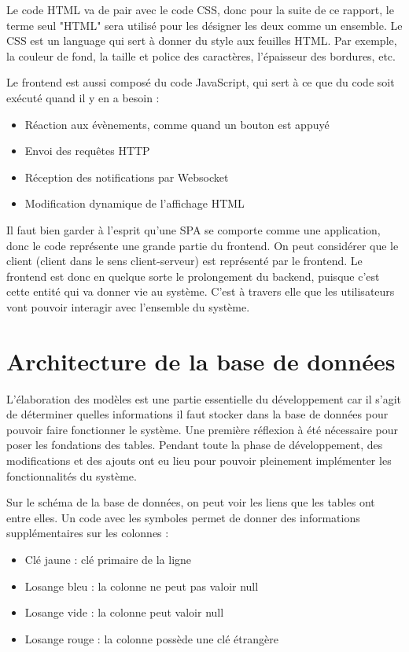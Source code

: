 \documentclass[
    iai, %
    eai, %
]{heig-tb}
\begin{document}
Le code HTML va de pair avec le code CSS, donc pour la suite de ce rapport, le terme seul "HTML" sera utilisé pour les désigner les deux comme un ensemble.
Le CSS est un language qui sert à donner du style aux feuilles HTML. Par exemple, la couleur de fond, la taille et police des caractères, l'épaisseur des bordures, etc.

Le frontend est aussi composé du code JavaScript, qui sert à ce que du code soit exécuté quand il y en a besoin :
\begin{itemize}
  \item Réaction aux évènements, comme quand un bouton est appuyé
  \item Envoi des requêtes HTTP
  \item Réception des notifications par Websocket
  \item Modification dynamique de l'affichage HTML
\end{itemize}
\bigskip

Il faut bien garder à l'esprit qu'une SPA se comporte comme une application, donc le code représente une grande partie du frontend.
On peut considérer que le client (client dans le sens client-serveur) est représenté par le frontend. Le frontend est donc en quelque sorte le prolongement du backend, puisque c'est cette entité qui va donner vie au système. C'est à travers elle que les utilisateurs vont pouvoir interagir avec l'ensemble du système.

\chapter{Architecture de la base de données}
L'élaboration des modèles est une partie essentielle du développement car il s'agit de déterminer quelles informations il faut stocker dans la base de données pour pouvoir faire fonctionner le système. Une première réflexion à été nécessaire pour poser les fondations des tables. Pendant toute la phase de développement, des modifications et des ajouts ont eu lieu pour pouvoir pleinement implémenter les fonctionnalités du système.
\newpage

Sur le schéma de la base de données, on peut voir les liens que les tables ont entre elles. Un code avec les symboles permet de donner des informations supplémentaires sur les colonnes :
\begin{itemize}
  \item Clé jaune : clé primaire de la ligne
  \item Losange bleu : la colonne ne peut pas valoir null
  \item Losange vide : la colonne peut valoir null
  \item Losange rouge : la colonne possède une clé étrangère
\end{itemize}
\bigskip
\end{document}
